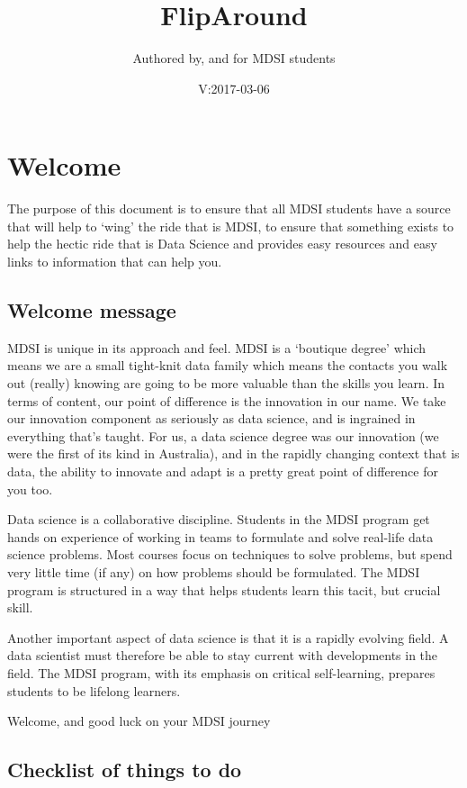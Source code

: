 \documentclass[]{book}
\title{FlipAround}
\author{Authored by, and for MDSI students}
\date{V:2017-03-06}
\theoremstyle{definition}
\theoremstyle{definition}
\theoremstyle{remark}
\begin{document}
\maketitle

{
\setcounter{tocdepth}{1}
\tableofcontents
}
\chapter{Welcome}\label{welcome}

The purpose of this document is to ensure that all MDSI students have a
source that will help to `wing' the ride that is MDSI, to ensure that
something exists to help the hectic ride that is Data Science and
provides easy resources and easy links to information that can help you.

\section{Welcome message}\label{welcome-message}

MDSI is unique in its approach and feel. MDSI is a `boutique degree'
which means we are a small tight-knit data family which means the
contacts you walk out (really) knowing are going to be more valuable
than the skills you learn. In terms of content, our point of difference
is the innovation in our name. We take our innovation component as
seriously as data science, and is ingrained in everything that's taught.
For us, a data science degree was our innovation (we were the first of
its kind in Australia), and in the rapidly changing context that is
data, the ability to innovate and adapt is a pretty great point of
difference for you too.

Data science is a collaborative discipline. Students in the MDSI program
get hands on experience of working in teams to formulate and solve
real-life data science problems. Most courses focus on techniques to
solve problems, but spend very little time (if any) on how problems
should be formulated. The MDSI program is structured in a way that helps
students learn this tacit, but crucial skill.

Another important aspect of data science is that it is a rapidly
evolving field. A data scientist must therefore be able to stay current
with developments in the field. The MDSI program, with its emphasis on
critical self-learning, prepares students to be lifelong learners.

Welcome, and good luck on your MDSI journey

\section{Checklist of things to do}\label{checklist-of-things-to-do}
\end{document}
